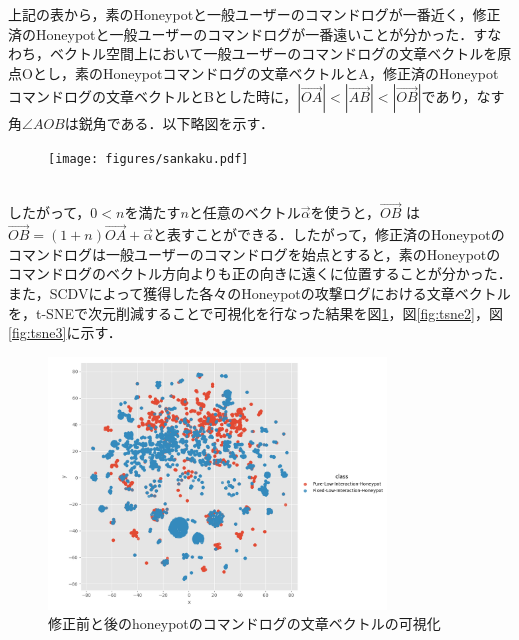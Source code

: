上記の表から，素のHoneypotと一般ユーザーのコマンドログが一番近く，修正済のHoneypotと一般ユーザーのコマンドログが一番遠いことが分かった．すなわち，ベクトル空間上において一般ユーザーのコマンドログの文章ベクトルを原点Oとし，素のHoneypotコマンドログの文章ベクトルとA，修正済のHoneypotコマンドログの文章ベクトルとBとした時に，$ |\vec{OA}| < |\vec{AB}| < |\vec{OB}| $であり，なす角$ \angle AOB $は鋭角である．以下略図を示す．\\

\clearpage

\begin{figure}[htbp]
    \centering
    \texttt{[image: figures/sankaku.pdf]}
\end{figure}\\

したがって，$ 0 < n $を満たす$ n $と任意のベクトル$ \vec{\alpha} $を使うと，$ \vec{OB} $ は $ \vec{OB} = (1+n)\vec{OA} + \vec{\alpha} $と表すことができる．したがって，修正済のHoneypotのコマンドログは一般ユーザーのコマンドログを始点とすると，素のHoneypotのコマンドログのベクトル方向よりも正の向きに遠くに位置することが分かった．\\

また，SCDVによって獲得した各々のHoneypotの攻撃ログにおける文章ベクトルを，t-SNEで次元削減することで可視化を行なった結果を図\ref{fig:tsne1}，図\ref{fig:tsne2}，図\ref{fig:tsne3}に示す．

\vspace{10mm}
\begin{figure}[htbp]
    \centering
    \includegraphics[width=0.8\textwidth]{figures/sufix.png}
    \caption{修正前と後のhoneypotのコマンドログの文章ベクトルの可視化}
    \label{fig:tsne1}
\end{figure}
\vspace{10mm}

